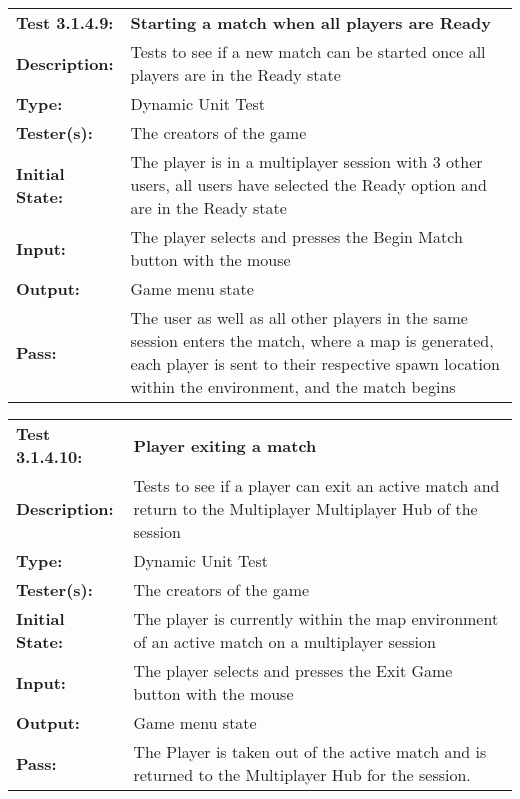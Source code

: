 \documentclass[12pt, titlepage]{article}
\begin{document}
\begin{mdframed}[linewidth=1pt]
\begin{tabularx}{\textwidth}{@{}p{3cm}X@{}}
{\bf Test 3.1.4.9:} & {\bf Starting a match when all players are Ready}\\[\baselineskip]
{\bf Description:} & Tests to see if a new match can be started once all players are in the Ready state\\[0.5\baselineskip]
{\bf Type:} & Dynamic Unit Test\\[0.5\baselineskip]
{\bf Tester(s):} & The creators of the game\\[0.5\baselineskip]
{\bf Initial State:} & The player is in a multiplayer session with 3 other users, all users have selected the Ready option and are in the Ready state\\[0.5\baselineskip]
{\bf Input:} & The player selects and presses the Begin Match button with the mouse \\[0.5\baselineskip]
{\bf Output:} & Game menu state\\[0.5\baselineskip]
{\bf Pass:} & The user as well as all other players in the same session enters the match, where a map is generated, each player is sent to their respective spawn location within the environment, and the match begins
\end{tabularx}
\end{mdframed}

\begin{mdframed}[linewidth=1pt]
\begin{tabularx}{\textwidth}{@{}p{3cm}X@{}}
{\bf Test 3.1.4.10:} & {\bf Player exiting a match }\\[\baselineskip]
{\bf Description:} & Tests to see if a player can exit an active match and return to the Multiplayer Multiplayer Hub of the session\\[0.5\baselineskip]
{\bf Type:} & Dynamic Unit Test\\[0.5\baselineskip]
{\bf Tester(s):} & The creators of the game\\[0.5\baselineskip]
{\bf Initial State:} & The player is currently within the map environment of an active match on a multiplayer session \\[0.5\baselineskip]
{\bf Input:} & The player selects and presses the Exit Game button with the mouse \\[0.5\baselineskip]
{\bf Output:} & Game menu state\\[0.5\baselineskip]
{\bf Pass:} & The Player is taken out of the active match and is returned to the Multiplayer Hub for the session.
\end{tabularx}
\end{mdframed}
\end{document}
